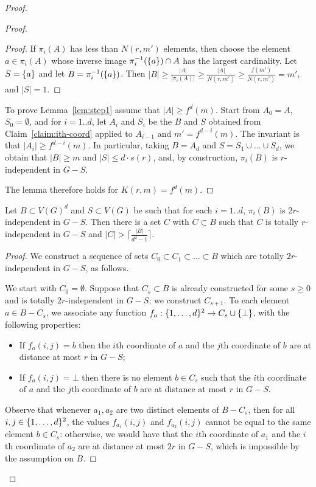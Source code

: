 \begin{proof}
\begin{proof}
\begin{proof}
If $\pi_i(A)$ has less than $N(r,m')$ elements, then choose the element $a\in\pi_i(A)$ whose inverse image $\pi_i^{-1}(\{a\})\cap A$ has the largest cardinality. Let $S=\{a\}$ 
and let $B=\pi_i^{-1}(\{a\})$. Then $|B|\ge \frac{|A|}{|\pi_i(A)|}\ge \frac{|A|}{N(r,m')}\ge \frac {f(m')}{N(r,m')}=m'$,
and $|S|=1$.

\end{proof}


To prove Lemma~\ref{lem:step1} 
assume that $|A|\ge f^d(m)$. 
Start from $A_0=A$, $S_0=\emptyset$, and for $i=1..d$,
let $A_{i}$ and $S_i$ be the $B$ and $S$ obtained from  Claim~\ref{claim:ith-coord} applied to $A_{i-1}$ and $m'=f^{d-i}(m)$.  The invariant is that $|A_i|\ge f^{d-i}(m)$.
In particular, 
taking $B=A_d$ and $S=S_1\cup\ldots \cup S_d$, we obtain that $|B|\ge m$ and $|S|\le d\cdot s(r)$, and, by construction, $\pi_i(B)$
is $r$-independent in $G-S$.

The lemma therefore holds for $K(r,m)=f^d(m).$
\end{proof}


\begin{lemma}\label{lem:step2}
	Let $B\subset V(G)^d$ and $S\subset V(G)$ be such that for each $i=1..d$,
	$\pi_i(B)$ is $2r$-independent in $G-S$.
	Then there is a set $C$ with $C\subset B$ 
	such that $C$ is totally $r$-independent in $G-S$
	and $|C|> \lceil\frac{|B|}{d^2-1}\rceil$.
\end{lemma}
\begin{proof}
We construct a sequence of sets $C_0\subset C_1\subset \ldots\subset B$ which are totally $2r$-independent in $G-S$, as follows.

We start with $C_0=\emptyset$. Suppose that $C_s\subset B$ is 
 already constructed for some $s\ge 0$
 and is totally $2r$-independent in $G-S$; we construct $C_{s+1}$.  To each element $a\in B-C_s$,
we associate any function $f_a:\{1,\ldots,d\}^2\to C_s\cup \{\bot\}$,
with the following properties:
\begin{itemize}
	\item If $f_a(i,j)=b$ then the $i$th coordinate of $a$
	and the $j$th coordinate of $b$ are at distance at most $r$
	in $G-S$;
	\item If $f_a(i,j)=\bot$ then there is no element $b\in C_s$ 
	such that the $i$th coordinate of $a$ and the $j$th coordinate of $b$ are at distance at most $r$ in $G-S$.	
\end{itemize}
Observe that whenever $a_1, a_2$ are two distinct elements of $B-C_s$,
then for all $i,j\in \{1,\ldots,d\}^2$, the values $f_{a_1}(i,j)$ and $f_{a_2}(i,j)$
cannot be equal to the same element $b\in C_s$:
otherwise, we would have that the $i$th coordinate of $a_1$
and the $i$th coordinate of $a_2$ are at distance at most $2r$
in $G-S$, which is impossible by the assumption on $B$.


\end{proof}
\end{proof}
